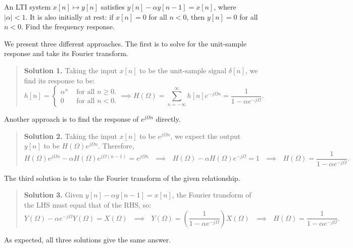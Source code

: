 \begin{problem}
    An LTI system $x[n] \mapsto y[n]$
    satisfies $y[n] - \alpha y[n - 1] = x[n]$, where $|\alpha| < 1$.
    It is also initially at rest: if $x[n] = 0$ for all $n < 0$,
    then $y[n] = 0$ for all $n < 0$.
    Find the frequency response.
\end{problem}

\begin{solution}
    We present three different approaches.
    The first is to solve for the unit-sample response
    and take its Fourier transform.
    \begin{quote}
        \textbf{Solution 1.} Taking the input $x[n]$
        to be the unit-sample signal $\delta[n]$,
        we find its response to be:
        \[
        h[n] = \begin{cases}
            \alpha^n & \text{ for all } n \geq 0. \\
            0 & \text{ for all } n < 0.
        \end{cases}
        \implies
        H(\Omega) = \sum_{n = -\infty}^{\infty} h[n] e^{-j \Omega n}
        = \frac{1}{1 - \alpha e^{-j \Omega}}.
        \]
    \end{quote}
    Another approach is to find the response of $e^{j \Omega n}$ directly.
    \begin{quote}
        \textbf{Solution 2.} Taking the input $x[n]$
        to be $e^{j \Omega n}$, we expect the output $y[n]$
        to be $H(\Omega) e^{j \Omega n}$.  Therefore,
        \[ H(\Omega) e^{j \Omega n} - \alpha H(\Omega) e^{j \Omega (n - 1)} = e^{j \Omega n}
        ~~~ \implies ~~~
        H(\Omega) - \alpha H(\Omega) e^{-j \Omega} = 1
        ~~~ \implies ~~~
        H(\Omega) = \frac{1}{1 - \alpha e^{-j \Omega}}. \]
    \end{quote}
    The third solution is to take the Fourier transform of the given relationship.
    \begin{quote}
        \textbf{Solution 3.} Given
        $y[n] - \alpha y[n - 1] = x[n]$, the Fourier transform of the LHS
        must equal that of the RHS, so:
        \[ Y(\Omega) - \alpha e^{-j \Omega} Y(\Omega) = X(\Omega)
        ~~~ \implies ~~~
        Y(\Omega) = \left(\frac{1}{1 - \alpha e^{-j \Omega}}\right) X(\Omega)
        ~~~ \implies ~~~
        H(\Omega) = \frac{1}{1 - \alpha e^{-j \Omega}}. \]
    \end{quote}
    As expected, all three solutions give the same answer.
\end{solution}

